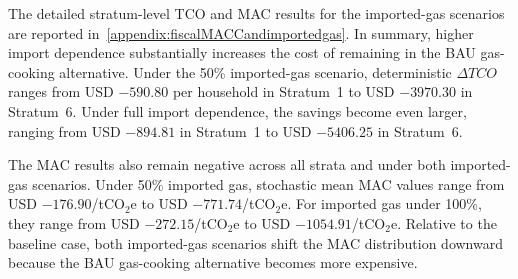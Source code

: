 \documentclass[authoryear,preprint,review,10pt]{elsarticle}
\begin{document}
The detailed stratum-level TCO and MAC results for the imported-gas scenarios are reported in~\ref{appendix:fiscalMACCandimportedgas}. In summary, higher import dependence substantially increases the cost of remaining in the BAU gas-cooking alternative. Under the 50\% imported-gas scenario, deterministic $\Delta TCO$ ranges from USD $-590.80$ per household in Stratum~1 to USD $-3970.30$ in Stratum~6. Under full import dependence, the savings become even larger, ranging from USD $-894.81$ in Stratum~1 to USD $-5406.25$ in Stratum~6.

The MAC results also remain negative across all strata and under both imported-gas scenarios. Under 50\% imported gas, stochastic mean MAC values range from USD $-176.90$/tCO$_2$e to USD $-771.74$/tCO$_2$e. For imported gas under 100\%, they range from USD $-272.15$/tCO$_2$e to USD $-1054.91$/tCO$_2$e. Relative to the baseline case, both imported-gas scenarios shift the MAC distribution downward because the BAU gas-cooking alternative becomes more expensive.

\begin{table}[H]
\centering
\caption{Aggregate fiscal impact under imported-gas scenarios in Bogotá}
\label{tab:import_scenarios_fiscal_aggregate}
\end{table}
\end{document}
